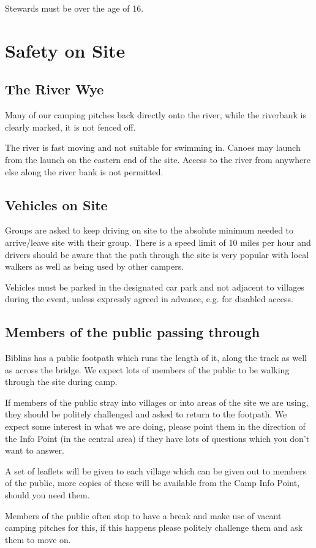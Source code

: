 \documentclass[a4paper, 11pt]{report}
\begin{document}
Stewards must be over the age of 16.

\chapter{Safety on Site}
\section{The River Wye}
Many of our camping pitches back directly onto the river, while the riverbank is clearly marked, it is not fenced off. \nl

The river is fast moving and not suitable for swimming in. Canoes may launch from the launch on the eastern end of the site. Access to the river from anywhere else along the river bank is not permitted. 

\section{Vehicles on Site}
Groups are asked to keep driving on site to the absolute minimum needed to arrive/leave site with their group.  There is a speed limit of 10 miles per hour and drivers should be aware that the path through the site is very popular with local walkers as well as being used by other campers.\nl

Vehicles must be parked in the designated car park and not adjacent to villages during the event, unless expressly agreed in advance, e.g. for disabled access.
\section{Members of the public passing through}
Biblins has a public footpath which runs the length of it, along the track as well as across the bridge. We expect lots of members of the public to be walking through the site during camp.\nl

If members of the public stray into villages or into areas of the site we are using, they should be politely challenged and asked to return to the footpath. We expect some interest in what we are doing, please point them in the direction of the Info Point (in the central area) if they have lots of questions which you don't want to answer.\nl

A set of leaflets will be given to each village which can be given out to members of the public, more copies of these will be available from the Camp Info Point, should you need them. \nl

Members of the public often stop to have a break and make use of vacant camping pitches for this, if this happens please politely challenge them and ask them to move on.\nl
\end{document}
